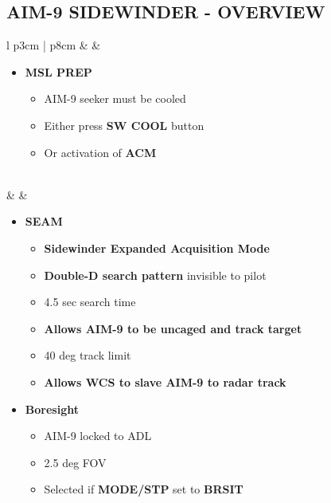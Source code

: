 \documentclass[8pt,usenames,dvipsnames,twoside]{article}
\begin{document}
		\subsection{AIM-9 SIDEWINDER - OVERVIEW}
		\begin{center}
			\begin{longtable}{l p{3cm} | p{8cm}}
				\toprule
				\textbullet &  \hfill \null {} \thumbnar & 
				\begin{minipage}[t]{\linewidth}
					\vspace{-7pt}
					\begin{itemize}
						\item \textbf{MSL PREP}
						\begin{itemize}
							\item AIM-9 seeker must be cooled
							\item Either press \textbf{SW COOL} button
							\item Or activation of \textbf{ACM}
						\end{itemize} 
					\end{itemize} 
				\end{minipage} \\
				\midrule
				\textbullet &  & 
				\begin{minipage}[t]{\linewidth}
					\vspace{-7pt}
					\begin{itemize}
						\item \textbf{SEAM} 
						\begin{itemize}
							\item \textbf{Sidewinder Expanded Acquisition Mode}
							\item \textbf{Double-D search pattern} invisible to pilot
							\item 4.5 sec search time
							\item \textbf{Allows AIM-9 to be uncaged and track target}
							\item 40 deg track limit
							\item \textbf{Allows WCS to slave AIM-9 to radar track}
						\end{itemize}
						\item \textbf{Boresight}
						\begin{itemize}
							\item AIM-9 locked to ADL
							\item 2.5 deg FOV
							\item Selected if  \textbf{MODE/STP} set to \textbf{BRSIT}

\end{itemize}
\end{itemize}
\end{minipage}
\end{longtable}
\end{center}
\end{document}
